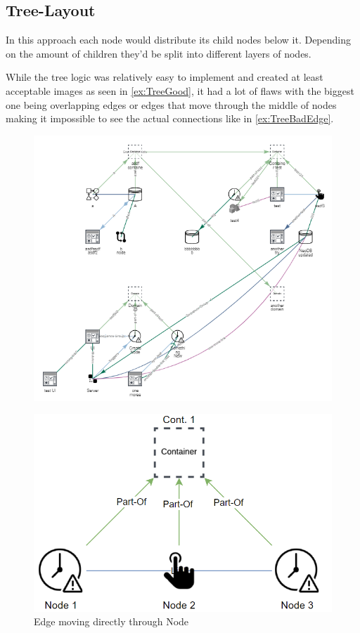 \subsection{Tree-Layout}
In this approach each node would distribute its child nodes below it. Depending on the amount of children they'd be split into different layers of nodes.

While the tree logic was relatively easy to implement and created at least acceptable images as seen in \autoref{ex:TreeGood}, it had a lot of flaws with the biggest one being overlapping edges or edges that move through the middle of nodes making it impossible to see the actual connections like in \autoref{ex:TreeBadEdge}.

\begin{figure}[H]
\centering
\includegraphics[scale=.7]{Bilder/TreeGood.png}
\label{ex:TreeGood}
\end{figure}

\begin{figure}[H] 
\centering
\includegraphics[scale=.4]{Bilder/TreeBad.png}
\caption{Edge moving directly through Node}
\label{ex:TreeBadEdge}
\end{figure}

